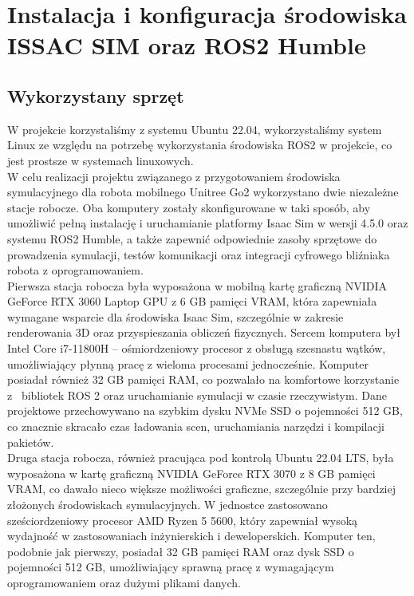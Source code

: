 \documentclass[12pt]{article}
\begin{document}
\clearpage

\section{Instalacja i konfiguracja środowiska ISSAC SIM oraz ROS2 Humble}

\subsection{Wykorzystany sprzęt}

W projekcie korzystaliśmy z systemu Ubuntu 22.04, wykorzystaliśmy system Linux ze względu na potrzebę wykorzystania środowiska ROS2 w projekcie, co jest prostsze w systemach linuxowych.\\ 

\noindent W celu realizacji projektu związanego z przygotowaniem środowiska symulacyjnego dla robota mobilnego Unitree Go2 wykorzystano dwie niezależne stacje robocze. Oba komputery zostały skonfigurowane w taki sposób, aby umożliwić pełną instalację i uruchamianie platformy Isaac Sim w wersji 4.5.0 oraz systemu ROS2 Humble, a także zapewnić odpowiednie zasoby sprzętowe do prowadzenia symulacji, testów komunikacji oraz integracji cyfrowego bliźniaka robota z oprogramowaniem.\\

\noindent Pierwsza stacja robocza była wyposażona w mobilną kartę graficzną NVIDIA GeForce RTX 3060 Laptop GPU z 6 GB pamięci VRAM, która zapewniała wymagane wsparcie dla środowiska Isaac Sim, szczególnie w zakresie renderowania 3D oraz przyspieszania obliczeń fizycznych. Sercem komputera był Intel Core i7-11800H – ośmiordzeniowy procesor z obsługą szesnastu wątków, umożliwiający płynną pracę z wieloma procesami jednocześnie. Komputer posiadał również 32 GB pamięci RAM, co pozwalało na komfortowe korzystanie z~ bibliotek ROS 2 oraz uruchamianie symulacji w czasie rzeczywistym. Dane projektowe przechowywano na szybkim dysku NVMe SSD o pojemności 512 GB, co znacznie skracało czas ładowania scen, uruchamiania narzędzi i kompilacji pakietów.\\

\noindent Druga stacja robocza, również pracująca pod kontrolą Ubuntu 22.04 LTS, była wyposażona w kartę graficzną NVIDIA GeForce RTX 3070 z 8 GB pamięci VRAM, co dawało nieco większe możliwości graficzne, szczególnie przy bardziej złożonych środowiskach symulacyjnych. W jednostce zastosowano sześciordzeniowy procesor AMD Ryzen 5 5600, który zapewniał wysoką wydajność w zastosowaniach inżynierskich i deweloperskich. Komputer ten, podobnie jak pierwszy, posiadał 32 GB pamięci RAM oraz dysk SSD o pojemności 512 GB, umożliwiający sprawną pracę z wymagającym oprogramowaniem oraz dużymi plikami danych. \\
\end{document}
